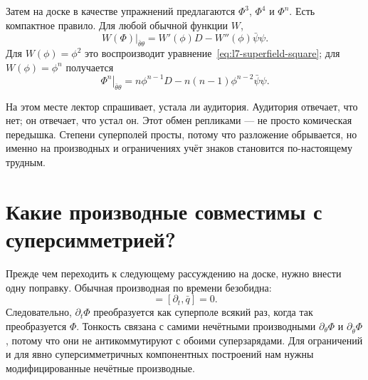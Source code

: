 Затем на доске в качестве упражнений предлагаются \(\Phi^3\), \(\Phi^4\) и \(\Phi^n\). Есть компактное правило. Для любой обычной функции \(W\),
\begin{equation}
\left.W(\Phi)\right|_{\bar\theta\theta}
=W'(\phi)D-W''(\phi)\bar\psi\psi.
\label{eq:l7-function-top-component}
\end{equation}
Для \(W(\phi)=\phi^2\) это воспроизводит уравнение~\eqref{eq:l7-superfield-square}; для \(W(\phi)=\phi^n\) получается
\begin{equation}
\left.\Phi^n\right|_{\bar\theta\theta}
=n\phi^{n-1}D-n(n-1)\phi^{n-2}\bar\psi\psi.
\end{equation}

На этом месте лектор спрашивает, устала ли аудитория. Аудитория отвечает, что нет; он отвечает, что устал он. Этот обмен репликами — не просто комическая передышка. Степени суперполей просты, потому что разложение обрывается, но именно на производных и ограничениях учёт знаков становится по-настоящему трудным.

\section{Какие производные совместимы с суперсимметрией?}

Прежде чем переходить к следующему рассуждению на доске, нужно внести одну поправку. Обычная производная по времени безобидна:
\begin{equation}
[\partial_t,q]=[\partial_t,\bar q]=0.
\end{equation}
Следовательно, \(\partial_t\Phi\) преобразуется как суперполе всякий раз, когда так преобразуется \(\Phi\). Тонкость связана с самими нечётными производными \(\partial_\theta\Phi\) и \(\partial_{\bar\theta}\Phi\), потому что они не антикоммутируют с обоими суперзарядами. Для ограничений и для явно суперсимметричных компонентных построений нам нужны модифицированные нечётные производные.

